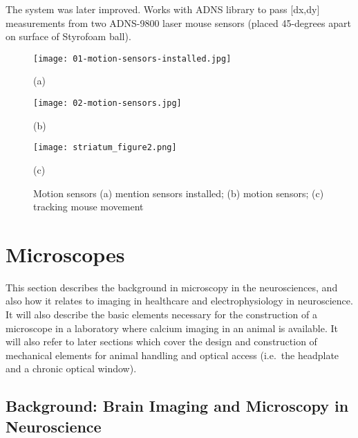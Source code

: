 \documentclass[../main.tex]{subfiles}
\begin{document}
The system was later improved.
Works with ADNS library to pass {[}dx,dy{]} measurements from two ADNS-9800 laser mouse sensors (placed 45-degrees apart on surface of Styrofoam ball).

\begin{figure}[htb]
	\begin{minipage}[t]{0.45\linewidth}\centering
		\texttt{[image: 01-motion-sensors-installed.jpg]}
		\centerline{(a)}
	\end{minipage}
	\hfill
	\begin{minipage}[t]{0.45\linewidth}\centering
		\texttt{[image: 02-motion-sensors.jpg]}
		\centerline{(b)}
	\end{minipage}
	\begin{minipage}[t]{\linewidth}\centering
		\texttt{[image: striatum\_figure2.png]}
		\centerline{(c)}
	\end{minipage}
	\caption{
		Motion sensors (a) mention sensors installed;
		(b) motion sensors; (c) tracking mouse movement}
	\label{fig:motion sensors}
\end{figure}

\section{
  Microscopes}\label{microscopes}

This section describes the background in microscopy in the neurosciences, and also how it relates to imaging in healthcare and electrophysiology in neuroscience.
It will also describe the basic elements necessary for the construction of a microscope in a laboratory where calcium imaging in an animal is available.
It will also refer to later sections which cover the design and construction of mechanical elements for animal handling and optical access (i.e.~the headplate and a chronic optical window).

\subsection{
	Background: Brain Imaging and Microscopy in Neuroscience}\label{background-brain-imaging-and-microscopy-in-neuroscience}
\end{document}
